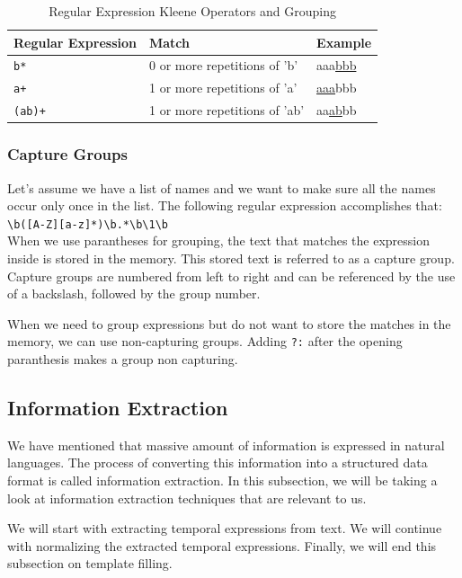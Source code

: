 \begin{table}[htbp]
  \caption[Regular Expression Kleene Operators and Grouping]{Regular Expression Kleene Operators and Grouping}\label{tab:re_kog}
  \centering
  \begin{tabular}{l l l}
    Regular Expression&Match&Example\\ \toprule
    \texttt{b*}&0 or more repetitions of 'b'&aaa\underline{bbb}\\ \hline
    \texttt{a+}&1 or more repetitions of 'a'&\underline{aaa}bbb\\ \hline
    \texttt{(ab)+}&1 or more repetitions of 'ab'&aa\underline{ab}bb\\ \hline
  \end{tabular}
\end{table}

\subsubsection{Capture Groups}

Let's assume we have a list of names and we want to make sure all the names occur only once in the list. 
The following regular expression accomplishes that:\\
\texttt{\textbackslash b([A-Z][a-z]*)\textbackslash b.*\textbackslash b\textbackslash1\textbackslash b}\\
When we use parantheses for grouping, the text that matches the expression inside is stored in the memory.
This stored text is referred to as a capture group.
Capture groups are numbered from left to right and can be referenced by the use of a backslash, followed by the group number. 

When we need to group expressions but do not want to store the matches in the memory, we can use non-capturing groups.
Adding \texttt{?:} after the opening paranthesis makes a group non capturing.

\subsection{Information Extraction}
We have mentioned that massive amount of information is expressed in natural languages.
The process of converting this information into a structured data format is called information extraction.
In this subsection, we will be taking a look at information extraction techniques that are relevant to us.

We will start with extracting temporal expressions from text. 
We will continue with normalizing the extracted temporal expressions.
Finally, we will end this subsection on template filling.


